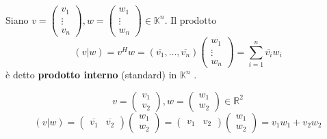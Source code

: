 \documentclass[a4paper]{article}
\theoremstyle{break}
\theoremstyle{break}
\theoremstyle{break}
\theoremstyle{break}
\begin{document}
Siano \( v = \begin{pmatrix} 
  v_1\\
  \vdots\\
  v_n
\end{pmatrix},
w = \begin{pmatrix} 
  w_1\\
  \vdots\\
  w_n
\end{pmatrix} \in \mathbb{K}^n
\).
Il prodotto
\[
  (v|w) = v^Hw = (\overline{v_1}, \ldots, \overline{v_n}) \begin{pmatrix} 
    w_1\\
    \vdots\\
    w_n
  \end{pmatrix}
  =
  \sum_{i=1}^{n} \overline{v_i}w_i
\] 
è detto \textbf{prodotto interno} (standard) in \( \mathbb{K}^n \) .
\begin{example}
  \[
  v = \begin{pmatrix} 
    v_1\\
    v_2
  \end{pmatrix} 
  ,
  w = \begin{pmatrix} 
    w_1\\
    w_2
  \end{pmatrix} 
  \in  \mathbb{R}^2
  \] 
  \[
    (v|w) = \begin{pmatrix} \overline{v_1} & \overline{v_2} \end{pmatrix}  \begin{pmatrix} 
      w_1\\
      w_2
    \end{pmatrix}
    = \begin{pmatrix} v_1 & v_2 \end{pmatrix}  \begin{pmatrix} 
      w_1\\
      w_2
    \end{pmatrix}
    =
    v_1w_1 + v_2w_2
  \] 
\end{example}
\end{document}
